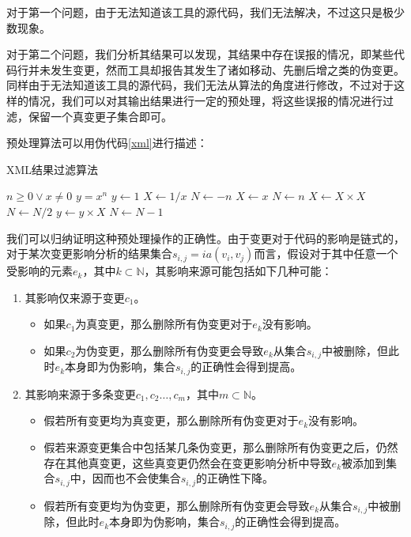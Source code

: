 对于第一个问题，由于无法知道该工具的源代码，我们无法解决，不过这只是极少数现象。

对于第二个问题，我们分析其结果可以发现，其结果中存在误报的情况，即某些代码行并未发生变更，然而工具却报告其发生了诸如移动、先删后增之类的伪变更。同样由于无法知道该工具的源代码，我们无法从算法的角度进行修改，不过对于这样的情况，我们可以对其输出结果进行一定的预处理，将这些误报的情况进行过滤，保留一个真变更子集合即可。

预处理算法可以用伪代码\ref {xml}进行描述：

\begin{algorithm}
	\caption{XML结果过滤算法}
	\label{xml}
	\begin{algorithmic}[1]
		  \REQUIRE $n \geq 0 \vee x \neq 0$
		  \ENSURE $y = x^n$
		  \STATE $y \gets 1$
		  \STATE $X \gets 1 / x$
		  \STATE $N \gets -n$
		  \ELSE
		  \STATE $X \gets x$
		  \STATE $N \gets n$
		  \ENDIF
		  \STATE $X \gets X \times X$
		  \STATE $N \gets N / 2$
		  \ELSE[$N$ is odd]
		  \STATE $y \gets y \times X$
		  \STATE $N \gets N - 1$
		  \ENDIF
		  \ENDWHILE
	\end{algorithmic}
\end{algorithm}

我们可以归纳证明这种预处理操作的正确性。由于变更对于代码的影响是链式的，对于某次变更影响分析的结果集合$s_{i,j} = ia(v_i,v_j)$而言，假设对于其中任意一个受影响的元素$e_k$，其中$k \subset \mathbb{N}$，其影响来源可能包括如下几种可能：
\begin{enumerate}
	\item 其影响仅来源于变更$c_1$。
		\begin{itemize}
			\item 如果$c_1$为真变更，那么删除所有伪变更对于$e_k$没有影响。
			\item 如果$c_2$为伪变更，那么删除所有伪变更会导致$e_k$从集合$s_{i,j}$中被删除，但此时$e_k$本身即为伪影响，集合$s_{i,j}$的正确性会得到提高。
		\end{itemize}
	\item 其影响来源于多条变更$c_1,c_2\dots,c_m$，其中$m \subset \mathbb{N}$。
		\begin{itemize}
			\item 假若所有变更均为真变更，那么删除所有伪变更对于$e_k$没有影响。
			\item 假若来源变更集合中包括某几条伪变更，那么删除所有伪变更之后，仍然存在其他真变更，这些真变更仍然会在变更影响分析中导致$e_k$被添加到集合$s_{i,j}$中，因而也不会使集合$s_{i,j}$的正确性下降。
			\item 假若所有变更均为伪变更，那么删除所有伪变更会导致$e_k$从集合$s_{i,j}$中被删除，但此时$e_k$本身即为伪影响，集合$s_{i,j}$的正确性会得到提高。
		\end{itemize}
\end{enumerate}

